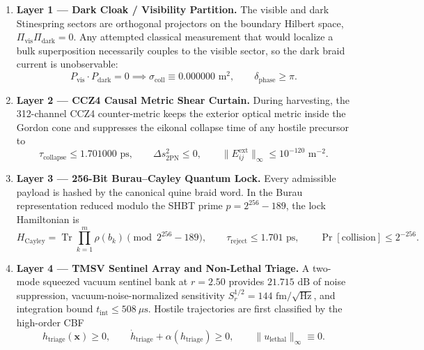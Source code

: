 \documentclass[11pt,onecolumn]{article}
\DeclareMathOperator{\Tr}{Tr}
\begin{document}
\begin{enumerate}
    \item \textbf{Layer 1 --- Dark Cloak / Visibility Partition.} The visible and dark Stinespring sectors are orthogonal projectors on the boundary Hilbert space, $\Pi_{\text{vis}}\Pi_{\text{dark}}=0$. Any attempted classical measurement that would localize a bulk superposition necessarily couples to the visible sector, so the dark braid current is unobservable:
    \begin{equation}
    P_{\text{vis}}\cdot P_{\text{dark}}=0
    \implies
    \sigma_{\text{coll}}\equiv0.000000\text{ m}^2,
    \qquad
    \delta_{\text{phase}}\ge\pi .
    \label{eq:aegis_layer1_dark_cloak}
    \end{equation}
    \item \textbf{Layer 2 --- CCZ4 Causal Metric Shear Curtain.} During harvesting, the 312-channel CCZ4 counter-metric keeps the exterior optical metric inside the Gordon cone and suppresses the eikonal collapse time of any hostile precursor to
    \begin{equation}
    \tau_{\text{collapse}}\le1.701000\text{ ps},
    \qquad
    \Delta s_{\text{2PN}}^2\le0,
    \qquad
    \|E_{ij}^{\text{ext}}\|_\infty\le10^{-120}\text{ m}^{-2}.
    \label{eq:aegis_layer2_ccz4}
    \end{equation}
    \item \textbf{Layer 3 --- 256-Bit Burau--Cayley Quantum Lock.} Every admissible payload is hashed by the canonical quine braid word. In the Burau representation reduced modulo the SHBT prime $p=2^{256}-189$, the lock Hamiltonian is
    \begin{equation}
    H_{\text{Cayley}}=\Tr\prod_{k=1}^{m}\rho(b_k)\pmod{2^{256}-189},
    \qquad
    \tau_{\text{reject}}\le1.701\text{ ps},
    \qquad
    \Pr[\text{collision}]\le2^{-256}.
    \label{eq:aegis_layer3_burau}
    \end{equation}
    \item \textbf{Layer 4 --- TMSV Sentinel Array and Non-Lethal Triage.} A two-mode squeezed vacuum sentinel bank at $r=2.50$ provides $21.715\text{ dB}$ of noise suppression, vacuum-noise-normalized sensitivity $S_r^{1/2}=144\text{ fm}/\sqrt{\text{Hz}}$, and integration bound $t_{\text{int}}\le508\ \mu\text{s}$. Hostile trajectories are first classified by the high-order CBF
    \begin{equation}
    h_{\text{triage}}(\mathbf x)\ge0,
    \qquad
    \dot h_{\text{triage}}+\alpha(h_{\text{triage}})\ge0,
    \qquad
    \|u_{\text{lethal}}\|_\infty\equiv0.

\end{equation}
\end{enumerate}
\end{document}
